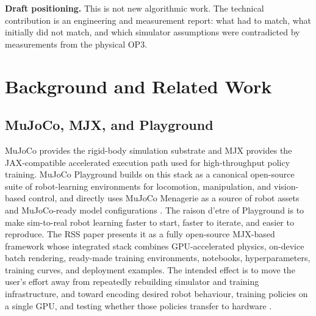 \textbf{Draft positioning.} This is not new algorithmic work. The technical contribution is an engineering and measurement report: what had to match, what initially did not match, and which simulator assumptions were contradicted by measurements from the physical OP3.

\section{Background and Related Work}
\label{sec:background}

\subsection{MuJoCo, MJX, and Playground}

MuJoCo provides the rigid-body simulation substrate and MJX provides the JAX-compatible accelerated execution path used for high-throughput policy training. MuJoCo Playground builds on this stack as a canonical open-source suite of robot-learning environments for locomotion, manipulation, and vision-based control, and directly uses MuJoCo Menagerie as a source of robot assets and MuJoCo-ready model configurations \citep{Todorov2012-mujoco-physics-engine-model-based-control,Zakka2022-mujoco-menagerie-collection-high-quality-simulation-models,Zakka2025-demonstrating-mujoco-playground,GoogleDeepMind2025-mujoco-playground-gpu-accelerated-robot-learning-sim-to-real-transfer}. The raison d'etre of Playground is to make sim-to-real robot learning faster to start, faster to iterate, and easier to reproduce. The RSS paper presents it as a fully open-source MJX-based framework whose integrated stack combines GPU-accelerated physics, on-device batch rendering, ready-made training environments, notebooks, hyperparameters, training curves, and deployment examples. The intended effect is to move the user's effort away from repeatedly rebuilding simulator and training infrastructure, and toward encoding desired robot behaviour, training policies on a single GPU, and testing whether those policies transfer to hardware \citep{Zakka2025-demonstrating-mujoco-playground}.


